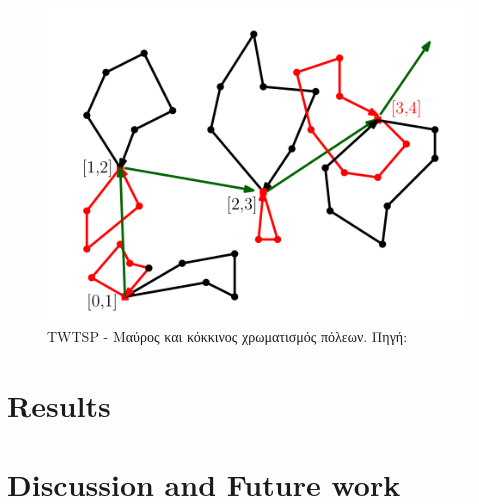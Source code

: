 \documentclass[oneside,12pt]{book}
\newenvironment{matlab}
	{\begin{figure}[hp]\centering\captionsetup{justification=centering}}
	{\end{figure}}
\theoremstyle{definition}
\begin{document}
\begin{matlab}
	\includegraphics[scale=0.8]{images/twtspd.png}
	\caption{TWTSP - Μαύρος και κόκκινος χρωματισμός πόλεων. Πηγή: \cite{12}}
\end{matlab} 

\chapter{Results}

\chapter{Discussion and Future work}
\end{document}
